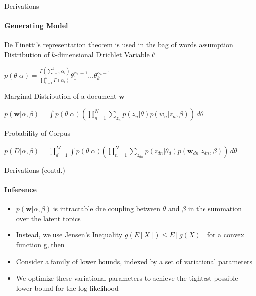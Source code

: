 \documentclass[aspectratio=169]{beamer}
\begin{document}
\begin{frame}{Derivations}
  \framesubtitle{Generating Model}
  De Finetti's representation theorem is used in the bag of words assumption \\
  Distribution of $k$-dimensional Dirichlet Variable $\theta$
  \begin{center}
    \begin{math}
      p(\theta | \alpha) = \frac{\Gamma\left(\sum^{k}_{i=1} \alpha_i\right)}{\prod^k_{i=1}\Gamma(\alpha_i)}\theta^{\alpha_{1}-1}_1 \dots\theta_k^{\alpha_{k}-1}
    \end{math}
  \end{center}
  Marginal Distribution of a document $\textbf{w}$
  \begin{center}
    \begin{math}
      p(\textbf{w} | \alpha, \beta) = \int p(\theta | \alpha) \left(\prod^N_{n=1}\sum_{z_{n}}p(z_{n}|\theta)p(w_{n}|z_{n}, \beta)\right) \,d\theta  
    \end{math}
  \end{center}
  Probability of Corpus 
  \begin{center}
  $p(\textit{D} | \alpha, \beta) = \prod^{M}_{d=1}\int p(\theta | \alpha) \left(\prod^N_{n=1}\sum_{z_{dn}}p(z_{dn}|\theta_d)p(\textbf{w}_{dn}|z_{dn}, \beta)\right) \,d\theta$
  \end{center}
\end{frame}

\begin{frame}{Derivations (contd.)}
  \framesubtitle{Inference}
\begin{itemize}
  \item $p(\textbf{w}|\alpha, \beta)$ is intractable due coupling between $\theta$ and $\beta$ in the summation over the latent topics \cite{dickey1983multiple}
  \item Instead, we use Jensen's Inequality $g(E[X]) \leq E[g(X)]$ for a convex function g, then
  \item Consider a family of lower bounds, indexed by a set of variational parameters
  \item We optimize these variational parameters to achieve the tightest possible lower bound for the log-likelihood
\end{itemize}
\end{frame}
\end{document}
